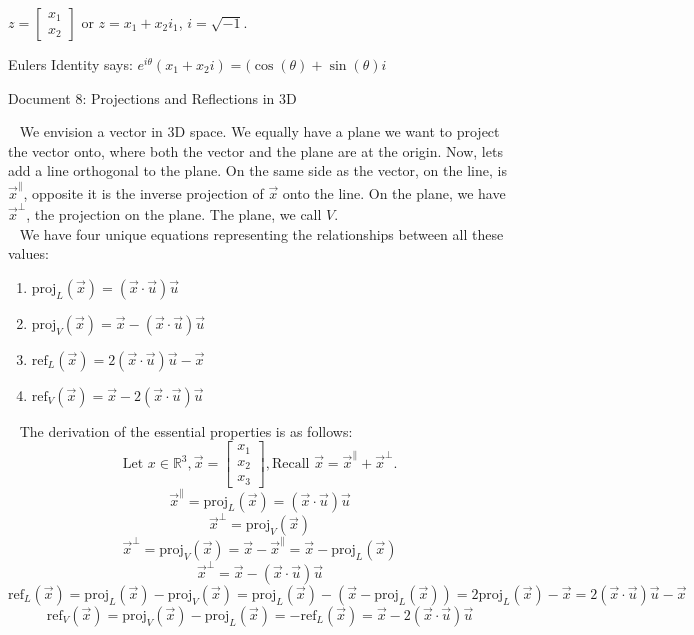 \documentclass[12pt]{article}
\begin{document}
$z=\begin{bmatrix}x_1\\x_2\end{bmatrix}$ or $z=x_1+x_2i_1$, $i=\sqrt{-1}$.

Eulers Identity says:
$e^{i\theta}(x_1+x_2i)=(\cos(\theta)+\sin(\theta)i$

\newpage
\begin{center}
Document 8: Projections and Reflections in 3D
\end{center}

\setlength{\leftskip}{0 in}
$\,\,\,$ We envision a vector in 3D space. We equally have a plane we want to project the vector onto, where both the vector and the plane are at the origin. Now, lets add a line orthogonal to the plane. On the same side as the vector, on the line, is $\vec{x}^\parallel$, opposite it is the inverse projection of $\vec{x}$ onto the line. On the plane, we have $\vec{x}^\perp$, the projection on the plane. The plane, we call $V$.\\

$\,\,\,$ We have four unique equations representing the relationships between all these values:
\begin{enumerate}
\item $\text{proj}_L(\vec{x})=(\vec{x}\cdot\vec{u})\vec{u}$
\item $\text{proj}_V(\vec{x})=\vec{x}-(\vec{x}\cdot\vec{u})\vec{u}$
\item $\text{ref}_L(\vec{x})=2(\vec{x}\cdot\vec{u})\vec{u}-\vec{x}$
\item $\text{ref}_V(\vec{x})=\vec{x}-2(\vec{x}\cdot\vec{u})\vec{u}$
\end{enumerate}

$\,\,\,$ The derivation of the essential properties is as follows:
$$\text{Let }x\in\mathbb{R}^3,\vec{x}=\begin{bmatrix}x_1\\x_2\\x_3\end{bmatrix},
\text{Recall }\vec{x}=\vec{x}^\parallel+\vec{x}^\perp.$$
$$\vec{x}^\parallel=\text{proj}_L(\vec{x})=(\vec{x}\cdot\vec{u})\vec{u}$$
$$\vec{x}^\perp=\text{proj}_V(\vec{x})$$
$$\vec{x}^\perp=\text{proj}_V(\vec{x})=\vec{x}-\vec{x}^\parallel=\vec{x}-\text{proj}_L(\vec{x})$$
$$\vec{x}^\perp=\vec{x}-(\vec{x}\cdot\vec{u})\vec{u}$$
$$\text{ref}_L(\vec{x})=\text{proj}_L(\vec{x})-\text{proj}_V(\vec{x})=\text{proj}_L(\vec{x})-(\vec{x}-\text{proj}_L(\vec{x}))=2\text{proj}_L(\vec{x})-\vec{x}=2(\vec{x}\cdot\vec{u})\vec{u}-\vec{x}$$
$$\text{ref}_V(\vec{x})=\text{proj}_V(\vec{x})-\text{proj}_L(\vec{x})=-\text{ref}_L(\vec{x})=\vec{x}-2(\vec{x}\cdot\vec{u})\vec{u}$$\\
\end{document}
